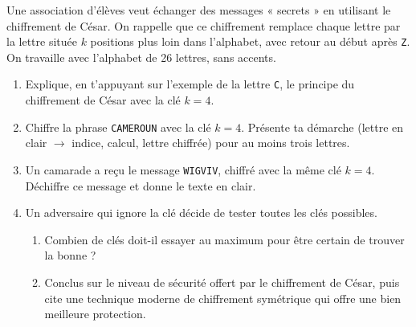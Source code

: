 \documentclass[11pt]{article}
\begin{document}
\begin{exercice}
Une association d'élèves veut échanger des messages « secrets » en utilisant le chiffrement de César. On rappelle que ce chiffrement remplace chaque lettre par la lettre située $k$ positions plus loin dans l'alphabet, avec retour au début après \texttt{Z}. On travaille avec l'alphabet de 26 lettres, sans accents.
\begin{enumerate}
\item Explique, en t'appuyant sur l'exemple de la lettre \texttt{C}, le principe du chiffrement de César avec la clé $k = 4$.
\item Chiffre la phrase \texttt{CAMEROUN} avec la clé $k = 4$. Présente ta démarche (lettre en clair $\rightarrow$ indice, calcul, lettre chiffrée) pour au moins trois lettres.
\item Un camarade a reçu le message \texttt{WIGVIV}, chiffré avec la même clé $k = 4$. Déchiffre ce message et donne le texte en clair.
\item Un adversaire qui ignore la clé décide de tester toutes les clés possibles.
\begin{enumerate}
\item Combien de clés doit-il essayer au maximum pour être certain de trouver la bonne ?
\item Conclus sur le niveau de sécurité offert par le chiffrement de César, puis cite une technique moderne de chiffrement symétrique qui offre une bien meilleure protection.
\end{enumerate}
\end{enumerate}
\end{exercice}
\end{document}

